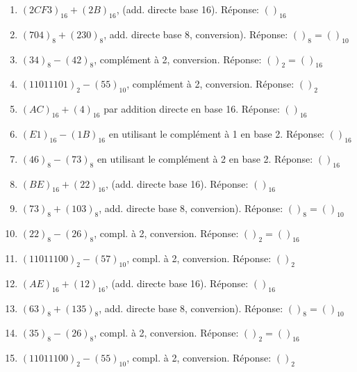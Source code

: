 \documentclass[11pt]{article}
\begin{document}
\begin{enumerate}
\item \((2CF3)_{16} + (2B)_{16}\), (add. directe base 16). Réponse: \(( )_{16}\)

\item \((704)_{8} + (230)_{8}\), add. directe base 8, conversion). Réponse: \(( )_{8} = ( )_{10}\)

\item \((34)_{8} - (42)_{8}\), complément à 2, conversion. Réponse: \(( )_{2} = ( )_{16}\)

\item \((11011101)_{2} - (55)_{10}\), complément à 2, conversion. Réponse: \(( )_{2}\)

\item \((AC)_{16} + (4)_{16}\) par addition directe en base 16. Réponse: \(( )_{16}\)

\item \((E1)_{16} - (1B)_{16}\) en utilisant le complément à 1 en base 2. Réponse: \(( )_{16}\)

\item \((46)_{8} - (73)_{8}\) en utilisant le complément à 2 en base 2. Réponse: \(( )_{16}\)

\item \((BE)_{16} + (22)_{16}\), (add. directe base 16). Réponse: \(( )_{16}\)

\item \((73)_{8} + (103)_{8}\), add. directe base 8, conversion). Réponse: \(( )_{8} = ( )_{10}\)

\item \((22)_{8} - (26)_{8}\), compl. à 2, conversion. Réponse: \(( )_{2} = ( )_{16}\)

\item \((11011100)_{2} - (57)_{10}\), compl. à 2, conversion. Réponse: \(( )_{2}\)

\item \((AE)_{16} + (12)_{16}\), (add. directe base 16). Réponse: \(( )_{16}\)

\item \((63)_{8} + (135)_{8}\), add. directe base 8, conversion). Réponse: \(( )_{8} = ( )_{10}\)

\item \((35)_{8} - (26)_{8}\), compl. à 2, conversion. Réponse: \(( )_{2} = ( )_{16}\)

\item \((11011100)_{2} - (55)_{10}\), compl. à 2, conversion. Réponse: \(( )_{2}\)
\end{enumerate}
\end{document}
